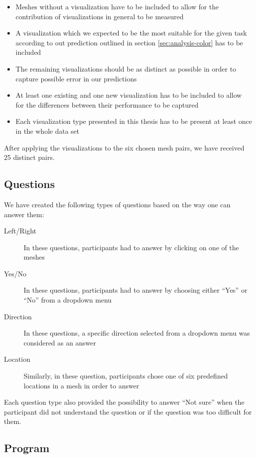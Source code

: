 \begin{itemize}
\item Meshes without a visualization have to be included to allow for the contribution of visualizations in general to be measured
\item A visualization which we expected to be the most suitable for the given task according to out prediction outlined in section \ref{sec:analysis-color} has to be included
\item The remaining visualizations should be as distinct as possible in order to capture possible error in our predictions
\item At least one existing and one new visualization has to be included to allow for the differences between their performance to be captured
\item Each visualization type presented in this thesis has to be present at least once in the whole data set
\end{itemize}

After applying the visualizations to the six chosen mesh pairs, we have received 25 distinct pairs.

\subsection{Questions}

We have created the following types of questions based on the way one can answer them:

\begin{description}
\item [Left/Right] In these questions, participants had to answer by clicking on one of the meshes
\item [Yes/No] In these questions, participants had to answer by choosing either ``Yes'' or ``No'' from a dropdown menu
\item [Direction] In these questions, a specific direction selected from a dropdown menu was considered as an answer
\item [Location] Similarly, in these question, participants chose one of six predefined locations in a mesh in order to answer
\end{description}

Each question type also provided the possibility to answer ``Not sure'' when the participant did not understand the question or if the question was too difficult for them.

\subsection{Program}

